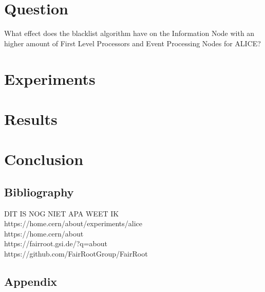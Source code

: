 \documentclass{report}
\begin{document}
\chapter{Question}
What effect does the blacklist algorithm have on the Information Node with an higher amount of First Level Processors and Event Processing Nodes for ALICE?

\chapter{Experiments}


\chapter{Results}

\chapter{Conclusion}

\section*{Bibliography}
DIT IS NOG NIET APA WEET IK\\
https://home.cern/about/experiments/alice\\
https://home.cern/about\\
https://fairroot.gsi.de/?q=about\\
https://github.com/FairRootGroup/FairRoot\\


\section{Appendix}
\end{document}
